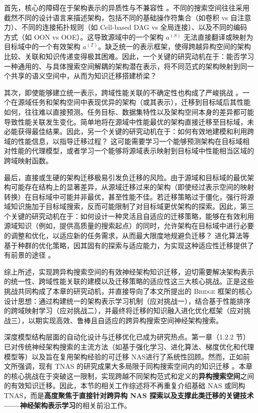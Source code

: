 \documentclass[../main.tex]{subfiles}
\begin{document}
首先，核心的障碍在于架构表示的异质性与不兼容性 。不同的搜索空间往往采用截然不同的设计语言来描述架构，包括不同的基础操作符集合（如卷积 vs 自注意力）、不同的连接拓扑规则（如 Cell-based DAG vs 全局连接）、以及不同的编码方式（如 OON vs OOE）。这导致源域中的一个架构 $a^{(S)}$ 无法直接翻译或映射为目标域中的一个有效架构 $a^{(T)}$。缺乏统一的表示框架，使得跨越异构空间的架构比较、关联和知识传递变得极其困难。因此，一个关键的研究动机在于：能否学习一种通用的、与具体搜索空间解耦的架构潜在表示，将不同范式的架构映射到同一个共享的语义空间中，从而为知识迁移搭建桥梁？

其次，即使能够建立统一表示，跨域性能关联的不确定性也构成了严峻挑战 。一个在源域任务和架构空间中表现优异的架构（或其表示），迁移到目标域后其性能如何，往往难以直接预测。任务目标、数据集特性以及架构空间本身的差异都可能导致性能关联发生变化。简单地将在源域中性能最优的架构直接迁移至目标域，未必能获得最佳结果。因此，另一个关键的研究动机在于：如何有效地建模和利用跨域的性能信息，以指导迁移过程？ 这可能需要学习一个能够预测架构在目标域相对性能的代理模型，或者学习一个能够将源域表示映射到目标域中性能相当区域的跨域映射函数。

最后，直接或生硬的架构迁移极易引发负迁移的风险。由于源域和目标域的最优架构可能存在结构上的显著差异，从源域迁移过来的架构（即使经过表示空间的映射转换）在目标域中可能并非最优，甚至性能不佳。若迁移策略过于僵化，强行将源域知识施加于目标域搜索，反而可能限制了对目标域更优架构的探索。因此，第三个关键的研究动机在于：如何设计一种灵活且自适应的迁移策略，能够在有效利用源域知识（例如，提供高质量的搜索起点）的同时，允许架构在目标域中进行必要的调整和优化，以适应新的任务需求，从而最大限度地规避负迁移？ 进化算法等基于种群的优化策略，因其固有的探索与适应能力，为实现这种适应性迁移提供了有前景的途径 。

综上所述，实现跨异构搜索空间的有效神经架构知识迁移，迫切需要解决架构表示的统一性、跨域性能关联的建模以及迁移策略的适应性这三大核心挑战。正是这些挑战共同构成了本章的研究动机，并直接导向了本文所提出的 \textsc{Bridge} 框架的核心设计思想：通过构建统一的架构表示学习机制（应对挑战一），结合基于性能排序的跨域映射学习（应对挑战二），并最终将迁移的知识融入进化优化框架（应对挑战三），以期实现高效、鲁棒且自适应的跨异构搜索空间神经架构搜索。


深度模型结构层面的自动化设计与迁移优化已成为研究热点。第一章（1.2.2 节）已对传统神经架构搜索的主流方法（如基于强化学习、进化算法、梯度优化和代理模型等）以及旨在复用架构经验的可迁移 NAS进行了系统性回顾。然而，正如前文所强调，现有 TNAS 的研究成果大多局限于同构搜索空间内的知识迁移 。本章的核心挑战在于突破这一限制，实现跨越不同架构范式和定义的\textbf{异构搜索空间}之间的有效知识迁移。因此，本节的相关工作综述将不再重复介绍基础 NAS 或同构 TNAS，而是\textbf{高度聚焦于直接针对跨异构 NAS 探索以及支撑此类迁移的关键技术——神经架构表示学习}的相关前沿工作。
\end{document}
